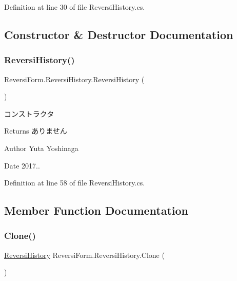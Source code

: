 Definition at line 30 of file Reversi\+History.\+cs.



\subsection{Constructor \& Destructor Documentation}
\mbox{\label{class_reversi_form_1_1_reversi_history_aef9c390a68d81077b70bc6181587106b}} 
\subsubsection{\texorpdfstring{Reversi\+History()}{ReversiHistory()}}
{\footnotesize\ttfamily Reversi\+Form.\+Reversi\+History.\+Reversi\+History (\begin{DoxyParamCaption}{ }\end{DoxyParamCaption})}



コンストラクタ 

\begin{DoxyReturn}{Returns}
ありません 
\end{DoxyReturn}
\begin{DoxyAuthor}{Author}
Yuta Yoshinaga 
\end{DoxyAuthor}
\begin{DoxyDate}{Date}
2017.. 
\end{DoxyDate}


Definition at line 58 of file Reversi\+History.\+cs.



\subsection{Member Function Documentation}
\mbox{\label{class_reversi_form_1_1_reversi_history_abfbbd1ca8654256ba743c3f07b573484}} 
\subsubsection{\texorpdfstring{Clone()}{Clone()}}
{\footnotesize\ttfamily \hyperlink{class_reversi_form_1_1_reversi_history}{Reversi\+History} Reversi\+Form.\+Reversi\+History.\+Clone (\begin{DoxyParamCaption}{ }\end{DoxyParamCaption})}



